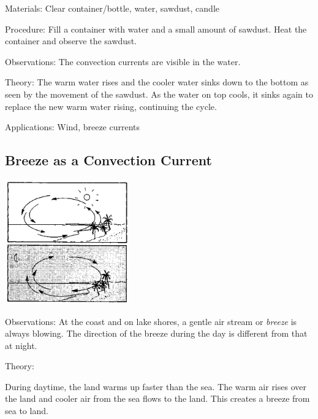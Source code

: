 \begin{multicols}{2}
\begin{description*}
\item[Materials:]{Clear container/bottle, water, sawdust, candle}
\item[Procedure:]{Fill a container with water and a small amount of sawdust. Heat the container and observe the sawdust.}
\item[Observations:]{The convection currents are visible in the water.}
\item[Theory:]{The warm water rises and the cooler water sinks down to the bottom as seen by the movement of the sawdust. As the water on top cools, it sinks again to replace the new warm water rising, continuing the cycle.}
\item[Applications:]{Wind, breeze currents}
\end{description*}

\subsection{Breeze as a Convection Current}

\begin{center}
\includegraphics[width=0.4\textwidth]{./img/source/breeze.png}
\end{center}

\begin{description*}
\item[Observations:]{At the coast and on lake shores, a gentle air stream or \emph{breeze} is always blowing. The direction of the breeze during the day is different from that at night.}
\item[Theory:]{During daytime, the land warms up faster than the sea. The warm air rises over the land and cooler air from the sea flows to the land. This creates a breeze from sea to land.

}
\end{description*}
\end{multicols}
